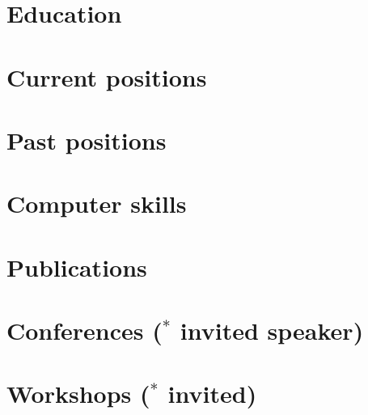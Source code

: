\documentclass[12pt, a4paper, twoside, openright, notitlepage]{article}
\theoremstyle{theorem}
\theoremstyle{definition}
\theoremstyle{remark}
\theoremstyle{proposition}
\begin{document}
  \section*{Education}

  \section*{Current positions}

  \section*{Past positions}

  \section*{Computer skills}

  \section*{Publications}

  \section*{Conferences ($^{\mathbf{*}}$ invited speaker)}

  \section*{Workshops ($^{\mathbf{*}}$ invited)}
\end{document}
